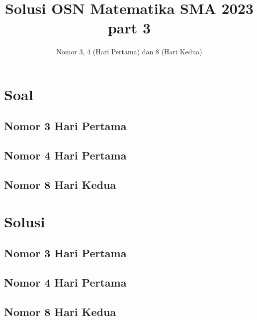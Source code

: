 \documentclass[12pt]{scrartcl}
\title{Solusi OSN Matematika SMA 2023\\ part 3}
\author{Nomor 3, 4 (Hari Pertama) dan 8 (Hari Kedua)}
\date{}
\begin{document}
\maketitle
\newpage
\section{Soal}
\subsection{Nomor 3 Hari Pertama}

\subsection{Nomor 4 Hari Pertama}

\subsection{Nomor 8 Hari Kedua}


\newpage

\section{Solusi}
\subsection{Nomor 3 Hari Pertama}

\subsection{Nomor 4 Hari Pertama}

\subsection{Nomor 8 Hari Kedua}

\end{document}
